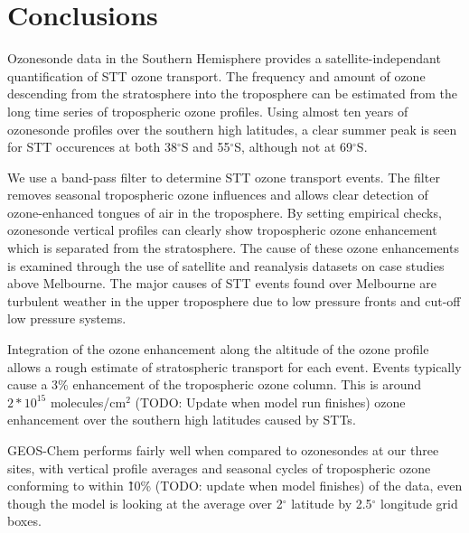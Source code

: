 \documentclass{article}
\begin{document}
  
\section{Conclusions}
  
  Ozonesonde data in the Southern Hemisphere provides a satellite-independant quantification of STT ozone transport.
  The frequency and amount of ozone descending from the stratosphere into the troposphere can be estimated from the long time series of tropospheric ozone profiles.
  Using almost ten years of ozonesonde profiles over the southern high latitudes, a clear summer peak is seen for STT occurences at both 38$^{\circ}$S and 55$^{\circ}$S, although not at 69$^{\circ}$S.
  
  We use a band-pass filter to determine STT ozone transport events.
  The filter removes seasonal tropospheric ozone influences and allows clear detection of ozone-enhanced tongues of air in the troposphere.
  By setting empirical checks, ozonesonde vertical profiles can clearly show tropospheric ozone enhancement which is separated from the stratosphere.
  The cause of these ozone enhancements is examined through the use of satellite and reanalysis datasets on case studies above Melbourne.
  The major causes of STT events found over Melbourne are turbulent weather in the upper troposphere due to low pressure fronts and cut-off low pressure systems.
  
  Integration of the ozone enhancement along the altitude of the ozone profile allows a rough estimate of stratospheric transport for each event.
  Events typically cause a 3\% enhancement of the tropospheric ozone column.
  This is around $2*10^{15}$ molecules/cm$^2$ (TODO: Update when model run finishes) ozone enhancement over the southern high latitudes caused by STTs.
  
  GEOS-Chem performs fairly well when compared to ozonesondes at our three sites, with vertical profile averages and seasonal cycles of tropospheric ozone conforming to within \~10\% (TODO: update when model finishes) of the data, even though the model is looking at the average over 2$^{\circ}$ latitude by 2.5$^{\circ}$ longitude grid boxes.
  

\end{document}
